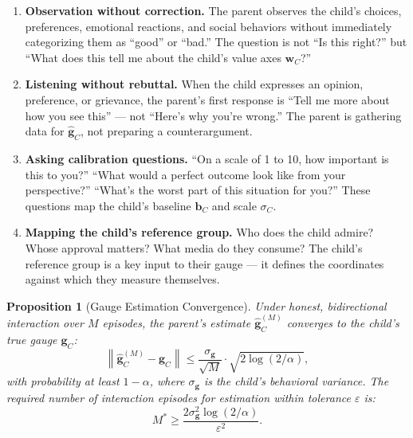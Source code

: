 \documentclass[11pt,a4paper]{article}
\newtheorem{proposition}[theorem]{Proposition}
\newcommand{\norm}[1]{\left\lVert#1\right\rVert}
\begin{document}
\begin{enumerate}[label=(\alph*)]
    \item \textbf{Observation without correction.} The parent observes the child's choices, preferences, emotional reactions, and social behaviors without immediately categorizing them as ``good'' or ``bad.'' The question is not ``Is this right?'' but ``What does this tell me about the child's value axes $\mathbf{w}_C$?''

    \item \textbf{Listening without rebuttal.} When the child expresses an opinion, preference, or grievance, the parent's first response is ``Tell me more about how you see this'' — not ``Here's why you're wrong.'' The parent is gathering data for $\hat{\mathbf{g}}_C$, not preparing a counterargument.

    \item \textbf{Asking calibration questions.} ``On a scale of 1 to 10, how important is this to you?'' ``What would a perfect outcome look like from your perspective?'' ``What's the worst part of this situation for you?'' These questions map the child's baseline $\mathbf{b}_C$ and scale $\sigma_C$.

    \item \textbf{Mapping the child's reference group.} Who does the child admire? Whose approval matters? What media do they consume? The child's reference group is a key input to their gauge — it defines the coordinates against which they measure themselves.
\end{enumerate}

\begin{proposition}[Gauge Estimation Convergence]
\label{prop:gauge_estimation}
Under honest, bidirectional interaction over $M$ episodes, the parent's estimate $\hat{\mathbf{g}}_C^{(M)}$ converges to the child's true gauge $\mathbf{g}_C$:
\begin{equation}
    \norm{\hat{\mathbf{g}}_C^{(M)} - \mathbf{g}_C} \leq \frac{\sigma_{\mathbf{g}}}{\sqrt{M}} \cdot \sqrt{2\log(2/\alpha)},
\end{equation}
with probability at least $1 - \alpha$, where $\sigma_{\mathbf{g}}$ is the child's behavioral variance. The required number of interaction episodes for estimation within tolerance $\varepsilon$ is:
\begin{equation}
    M^* \geq \frac{2\sigma_{\mathbf{g}}^2 \log(2/\alpha)}{\varepsilon^2}.
\end{equation}
\end{proposition}
\end{document}
